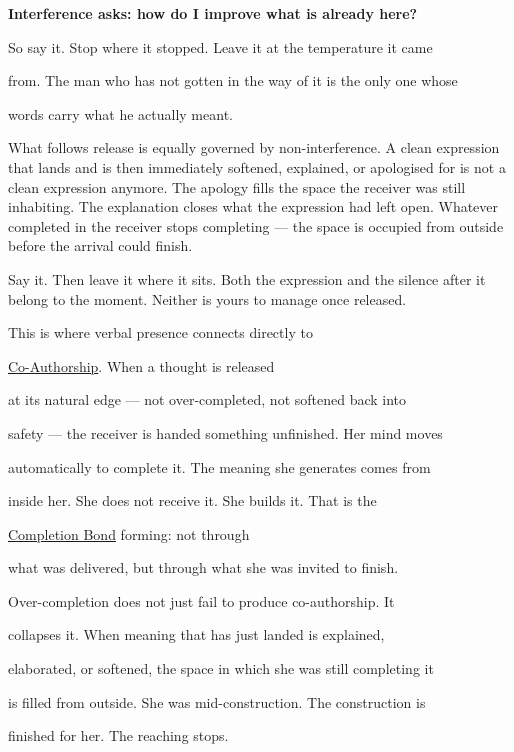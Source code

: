 \documentclass[12pt, a4paper]{article}
\begin{document}
\begin{center}

\textbf{Interference asks: how do I improve what is already here?}

\end{center}

So say it. Stop where it stopped. Leave it at the temperature it came

from. The man who has not gotten in the way of it is the only one whose

words carry what he actually meant.

What follows release is equally governed by non-interference. A clean
expression that lands and is then immediately softened, explained, or
apologised for is not a clean expression anymore. The apology fills the
space the receiver was still inhabiting. The explanation closes what the
expression had left open. Whatever completed in the receiver
stops completing --- the space is occupied from outside before the
arrival could finish.

Say it. Then leave it where it sits. Both the expression and the silence
after it belong to the moment. Neither is yours to manage once released.

This is where verbal presence connects directly to

\hyperref[sec:co_authorship]{Co-Authorship}. When a thought is released

at its natural edge --- not over-completed, not softened back into

safety --- the receiver is handed something unfinished. Her mind moves

automatically to complete it. The meaning she generates comes from

inside her. She does not receive it. She builds it. That is the

\hyperref[subsec:completion_bond]{Completion Bond} forming: not through

what was delivered, but through what she was invited to finish.

Over-completion does not just fail to produce co-authorship. It

collapses it. When meaning that has just landed is explained,

elaborated, or softened, the space in which she was still completing it

is filled from outside. She was mid-construction. The construction is

finished for her. The reaching stops.
\end{document}

